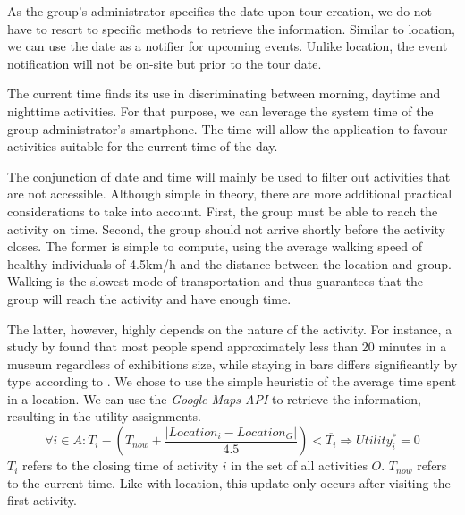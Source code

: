 \documentclass[11pt,a4paper,oneside]{article}
\begin{document}
As the group's administrator specifies the date upon tour creation, we do not have to resort to specific methods to retrieve the information. Similar to location, we can use the date as a notifier for upcoming events. Unlike location, the event notification will not be on-site but prior to the tour date.

The current time finds its use in discriminating between morning, daytime and nighttime activities. For that purpose, we can leverage the system time of the group administrator's smartphone. The time will allow the application to favour activities suitable for the current time of the day.

The conjunction of date and time will mainly be used to filter out activities that are not accessible. Although simple in theory, there are more additional practical considerations to take into account. First, the group must be able to reach the activity on time. Second, the group should not arrive shortly before the activity closes. The former is simple to compute, using the average walking speed of healthy individuals of 4.5km/h and the distance between the location and group. Walking is the slowest mode of transportation and thus guarantees that the group will reach the activity and have enough time. 

The latter, however, highly depends on the nature of the activity. For instance, a study by \citeauthor{serrell_PayingAttentionDuration_1997} found that most people spend approximately less than 20 minutes in a museum regardless of exhibitions size, while staying in bars differs significantly by type according to \citeauthor{harford_DrinkingBarsObservational_1983}.\cite{serrell_PayingAttentionDuration_1997}\cite{harford_DrinkingBarsObservational_1983} We chose to use the simple heuristic of the average time spent in a location. We can use the \emph{Google Maps API} to retrieve the information, resulting in the utility assignments. 
\begin{equation}
    \forall i \in A: T_i - (T_{now} + \frac{\lvert Location_i - Location_G \rvert}{4.5}) < \overline{T_i} \Rightarrow Utility_{i}^* = 0
\end{equation}
$T_i$ refers to the closing time of activity $i$ in the set of all activities $O$. $T_{now}$ refers to the current time. Like with location, this update only occurs after visiting the first activity. 
\end{document}
